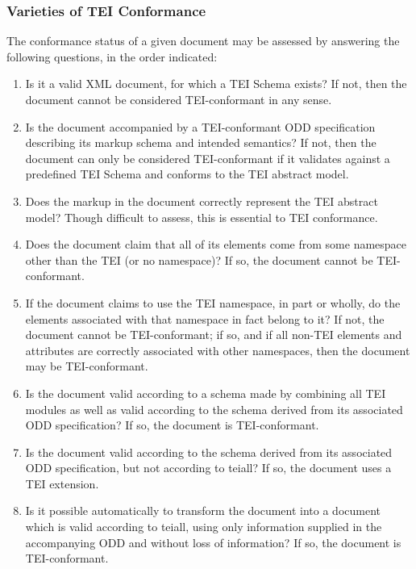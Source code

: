 \subsubsection[{Varieties of TEI Conformance}]{Varieties of TEI Conformance}\label{CFCATSCH}\par
The conformance status of a given document may be assessed by answering the following questions, in the order indicated: \begin{enumerate}
\item Is it a valid XML document, for which a TEI Schema exists? If not, then the document cannot be considered TEI-conformant in any sense.
\item Is the document accompanied by a TEI-conformant ODD specification describing its markup schema and intended semantics? If not, then the document can only be considered TEI-conformant if it validates against a predefined TEI Schema and conforms to the TEI abstract model.
\item Does the markup in the document correctly represent the TEI abstract model? Though difficult to assess, this is essential to TEI conformance.
\item Does the document claim that all of its elements come from some namespace other than the TEI (or no namespace)? If so, the document cannot be TEI-conformant.
\item If the document claims to use the TEI namespace, in part or wholly, do the elements associated with that namespace in fact belong to it? If not, the document cannot be TEI-conformant; if so, and if all non-TEI elements and attributes are correctly associated with other namespaces, then the document may be TEI-conformant.
\item Is the document valid according to a schema made by combining all TEI modules as well as valid according to the schema derived from its associated ODD specification? If so, the document is TEI-conformant. 
\item Is the document valid according to the schema derived from its associated ODD specification, but not according to \textsf{tei\textunderscore all}? If so, the document uses a TEI extension.
\item Is it possible automatically to transform the document into a document which is valid according to \textsf{tei\textunderscore all}, using only information supplied in the accompanying ODD and without loss of information? If so, the document is TEI-conformant.
\end{enumerate}\par
